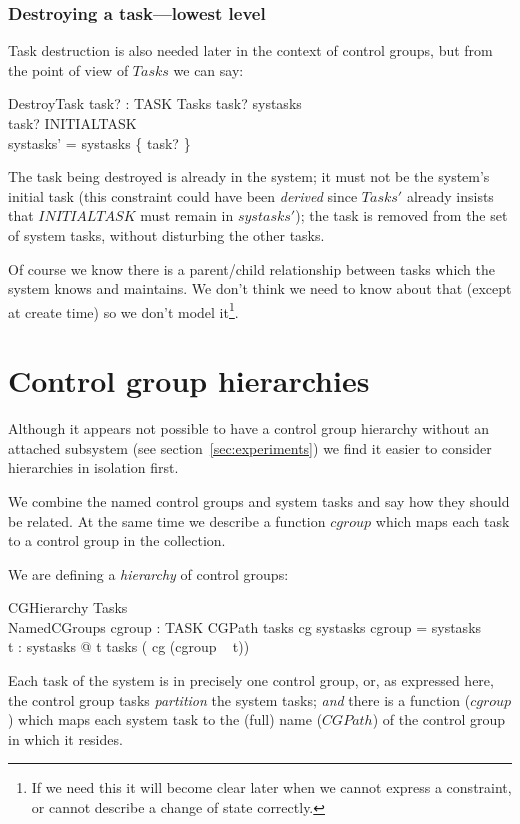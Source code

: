 \documentclass[a4paper,twoside,12pt]{article}
\begin{document}
\subsubsection{Destroying a task---lowest level}

Task destruction is also needed later in the context of control groups, but from the point of view of $Tasks$ we can say:

\begin{schema}{DestroyTask}
task? : TASK
\also
\Delta Tasks
\where
task? \in systasks \\
task? \neq INITIALTASK \\
systasks'  = systasks \setminus \{ task? \}
\end{schema}
The task being destroyed is already in the system; it must not be the system's initial task 
(this constraint could have been \emph{derived} since $Tasks'$ already insists that $INITIALTASK$ 
must remain in $systasks'$);
the task is removed from the set of system tasks, without disturbing the other tasks.

Of course we know there is a parent/child relationship between tasks which the system knows and maintains. 
We don't think we need to know about that (except at create time) so we don't model 
it\footnote{If we need this it will become clear later when we cannot express a constraint, 
or cannot describe a change of state correctly.}.

\section{Control group hierarchies}

Although it appears not possible to have a control group hierarchy without an attached subsystem 
(see section~\ref{sec:experiments}) we find it easier to consider hierarchies in isolation first.

We combine the named control groups and system tasks and say how they should be related. 
At the same time we describe a function $cgroup$ which maps each task to a control group in the collection.

We are defining a \emph{hierarchy} of control groups:

\begin{schema}{CGHierarchy}
Tasks \\
NamedCGroups
\also
cgroup : TASK \ffun CGPath
\where
tasks \circ cg \partition systasks
\also
\dom cgroup = systasks \\
\forall t : systasks @ t \in tasks ( cg (cgroup ~ t))
\end{schema}
Each task of the system is in precisely one control group, or, as expressed here, 
the control group tasks \emph{partition} the system tasks; 
\emph{and} there is a function ($cgroup$) which maps each system task to the (full) name 
($CGPath$) of the control group in which it resides.
\end{document}
